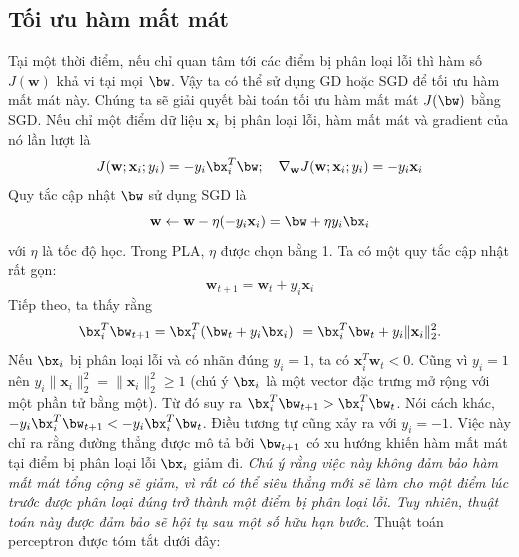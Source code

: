 \subsection{Tối ưu hàm mất mát} 
Tại một thời điểm, nếu chỉ quan tâm tới các điểm bị phân loại lỗi thì hàm số
$J(\mathbf{w})$ khả vi tại mọi $\bw$. Vậy ta có thể sử dụng GD hoặc SGD để tối
ưu hàm mất mát này. Chúng ta sẽ giải quyết bài toán tối ưu hàm mất mát $J(\bw)$
bằng SGD. Nếu chỉ {một} điểm dữ liệu $\mathbf{x}_i$ bị phân loại lỗi, hàm mất
mát và gradient của nó lần lượt là
\begin{equation} 
    J(\mathbf{w}; \mathbf{x}_i; y_i) = -y_i\bx_i^T\bw; \quad 
    \nabla_{\mathbf{w}}J(\mathbf{w}; \mathbf{x}_i; y_i) = -y_i\mathbf{x}_i 
\end{equation} 
Quy tắc cập nhật $\bw$ sử dụng SGD là
\begin{equation} 
\mathbf{w} \leftarrow \mathbf{w} - \eta (-y_i\mathbf{x}_i) = \bw + \eta y_i\bx_i
\end{equation} 
với $\eta$ là tốc độ học. Trong PLA, $\eta$ được chọn bằng 1. Ta có một quy tắc cập nhật rất gọn:
\begin{equation}
    \mathbf{w}_{t+1} = \mathbf{w}_{t} + y_i\mathbf{x}_i
\end{equation} 
Tiếp theo, ta thấy rằng
\begin{equation} 
\bx_i^T\bw_{t+1} = \bx_i^T(\bw_t + y_i\bx_i) \\\ 
= \bx_i^T\bw_t + y_i \|\mathbf{x}_i\|_2^2. 
\end{equation} 
Nếu $\bx_i$ bị phân loại lỗi và có nhãn đúng $y_i = 1$, ta có
$\mathbf{x}_{i}^T\mathbf{w}_t < 0$. Cũng vì $y_i = 1$ nên $y_i
\|\mathbf{x}_i\|_2^2 = \|\mathbf{x}_i\|_2^2 \geq 1$ (chú ý $\bx_i$ là một vector đặc
trưng {mở rộng} với một phần tử bằng một). Từ đó suy ra $\bx_i^T\bw_{t+1} > \bx_i^T\bw_t$. Nói cách khác,
$-y_i\bx_i^T\bw_{t+1} < -y_i\bx_i^T\bw_t$. Điều tương tự cũng xảy ra với $y_i = -1$.
Việc này chỉ ra rằng đường thẳng được mô tả bởi $\bw_{t+1}$ có xu hướng khiến
hàm mất mát tại điểm bị phân loại lỗi $\bx_i$ giảm đi. \textit{Chú ý rằng việc
này không đảm bảo hàm mất mát tổng cộng sẽ giảm, vì rất có thể siêu
thẳng mới sẽ làm cho một điểm lúc trước được phân loại đúng trở thành một điểm bị
phân loại lỗi. Tuy nhiên, thuật toán này được đảm bảo sẽ hội tụ sau một số hữu
hạn bước.} Thuật toán perceptron được tóm tắt dưới đây:
 
